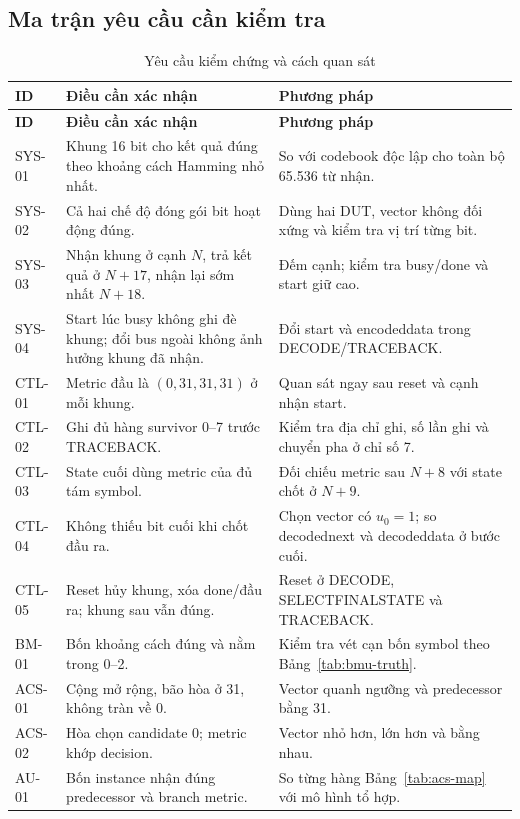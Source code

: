 \documentclass[12pt,a4paper]{article}
\renewcommand{\_}{\originalunderscore\allowbreak}
\begin{document}
\subsection{Ma trận yêu cầu cần kiểm tra}
\small
\begin{longtable}{@{}P{1.7cm}P{7.4cm}P{5.9cm}@{}}
\caption{Yêu cầu kiểm chứng và cách quan sát}\label{tab:verification}\\
\toprule\textbf{ID}&\textbf{Điều cần xác nhận}&\textbf{Phương pháp}\\\midrule\endfirsthead
\toprule\textbf{ID}&\textbf{Điều cần xác nhận}&\textbf{Phương pháp}\\\midrule\endhead
SYS-01&Khung 16 bit cho kết quả đúng theo khoảng cách Hamming nhỏ nhất.&So với codebook độc lập cho toàn bộ 65.536 từ nhận.\\
SYS-02&Cả hai chế độ đóng gói bit hoạt động đúng.&Dùng hai DUT, vector không đối xứng và kiểm tra vị trí từng bit.\\
SYS-03&Nhận khung ở cạnh $N$, trả kết quả ở $N+17$, nhận lại sớm nhất $N+18$.&Đếm cạnh; kiểm tra busy/done và start giữ cao.\\
SYS-04&Start lúc busy không ghi đè khung; đổi bus ngoài không ảnh hưởng khung đã nhận.&Đổi start và encoded\_data trong DECODE/TRACEBACK.\\
CTL-01&Metric đầu là $(0,31,31,31)$ ở mỗi khung.&Quan sát ngay sau reset và cạnh nhận start.\\
CTL-02&Ghi đủ hàng survivor 0--7 trước TRACEBACK.&Kiểm tra địa chỉ ghi, số lần ghi và chuyển pha ở chỉ số 7.\\
CTL-03&State cuối dùng metric của đủ tám symbol.&Đối chiếu metric sau $N+8$ với state chốt ở $N+9$.\\
CTL-04&Không thiếu bit cuối khi chốt đầu ra.&Chọn vector có $u_0=1$; so decoded\_next và decoded\_data ở bước cuối.\\
CTL-05&Reset hủy khung, xóa done/đầu ra; khung sau vẫn đúng.&Reset ở DECODE, SELECT\_FINAL\_STATE và TRACEBACK.\\
BM-01&Bốn khoảng cách đúng và nằm trong 0--2.&Kiểm tra vét cạn bốn symbol theo Bảng~\ref{tab:bmu-truth}.\\
ACS-01&Cộng mở rộng, bão hòa ở 31, không tràn về 0.&Vector quanh ngưỡng và predecessor bằng 31.\\
ACS-02&Hòa chọn candidate 0; metric khớp decision.&Vector nhỏ hơn, lớn hơn và bằng nhau.\\
AU-01&Bốn instance nhận đúng predecessor và branch metric.&So từng hàng Bảng~\ref{tab:acs-map} với mô hình tổ hợp.\\

\end{longtable}
\end{document}

